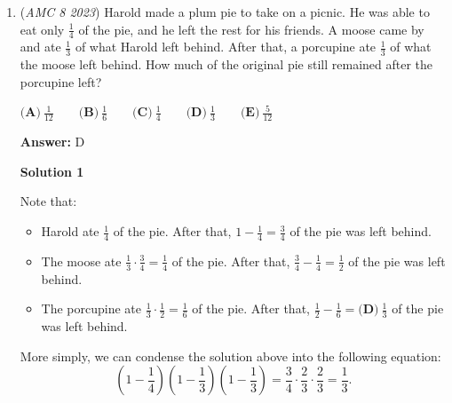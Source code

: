 \begin{enumerate}
 



\textbf{Solution 2}

Notice that the entire section between the $2$ second mark and the $14$ second mark is between the $4$ and $7$ feet elevation level except the $2$ seconds where she skis just under the $4$ feet mark and when she skis just above the $7$ feet mark, making the answer $14-2-2-2=\boxed{\textbf{(B)}\ 8}.$



	\item (\textit{AMC 8 2023}) Harold made a plum pie to take on a picnic. He was able to eat only $\frac{1}{4}$ of the pie, and he left the rest for his friends. A moose came by and ate $\frac{1}{3}$ of what Harold left behind. After that, a porcupine ate $\frac{1}{3}$ of what the moose left behind. How much of the original pie still remained after the porcupine left?


 $\textbf{(A)}\ \frac{1}{12} \qquad \textbf{(B)}\ \frac{1}{6} \qquad \textbf{(C)}\ \frac{1}{4} \qquad \textbf{(D)}\ \frac{1}{3} \qquad \textbf{(E)}\ \frac{5}{12}$

 \textbf{Answer: }D



\textbf{Solution 1}

Note that:

 
            \begin{itemize}
        \item Harold ate $\frac14$ of the pie. After that, $1-\frac14=\frac34$ of the pie was left behind.
            \end{itemize}
            
            \begin{itemize}
        \item The moose ate $\frac13\cdot\frac34 = \frac14$ of the pie. After that, $\frac34 - \frac14 = \frac12$ of the pie was left behind.
            \end{itemize}
            
            \begin{itemize}
        \item The porcupine ate $\frac13\cdot\frac12 = \frac16$ of the pie. After that, $\frac12 - \frac16 = \boxed{\textbf{(D)}\ \frac{1}{3}}$ of the pie was left behind.
            \end{itemize}
            More simply, we can condense the solution above into the following equation: 
 \[\left(1-\frac14\right)\left(1-\frac13\right)\left(1-\frac13\right) = \frac34\cdot\frac23\cdot\frac23 = \frac13.\]





\end{enumerate}
